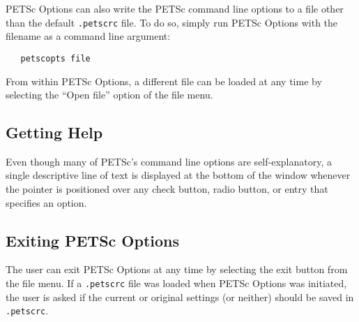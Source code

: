 PETSc Options can also write the PETSc command line options to a file
other than the default {\tt .petscrc} file. To do so, simply run PETSc
Options with the filename as a command line argument:
\begin{verbatim}
   petscopts file
\end{verbatim}
From within PETSc Options, a different file can be loaded at any time
by selecting the ``Open file'' option of the file menu.

\subsection{Getting Help}

Even though many of PETSc's command line options are self-explanatory,
a single descriptive line of text is displayed at the bottom of the
window whenever the pointer is positioned over any check button, radio
button, or entry that specifies an option.

\subsection{Exiting PETSc Options}

The user can exit PETSc Options at any time by selecting the exit
button from the file menu.  If a {\tt .petscrc} file was loaded when
PETSc Options was initiated, the user is asked if the current or
original settings (or neither) should be saved in {\tt .petscrc}.








